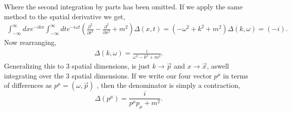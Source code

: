 \documentclass[working, oneside]{../../Preambles/tuftebook}
\begin{document}
Where the second integration by parts has been omitted. If we apply the same method to the spatial derivative we get, 
\begin{align*}
    \int_{-\infty}^{\infty} dx e^{-ikx}\int_{-\infty}^{\infty} dte^{-i\omega t} \left( \frac{\partial ^2}{\partial t^2} - \frac{\partial ^2}{\partial x^2} +m^2 \right) \Delta\left( x,t \right) = \left( -\omega^2 + k^2 + m^2 \right) \Delta\left( k, \omega \right) = \left( -i \right) 
.\end{align*}
Now rearranging,
\begin{align*}
    \Delta\left( k, \omega \right) = \frac{i}{\omega^2 - k^2 + m^2}
.\end{align*}
Generalizing this to 3 spatial dimensions, is just $k \to \vec{p}$ and $x \to \vec{x}$, aswell integrating over the 3 spatial dimensions. If we write our four vector $p^{\mu }$ in terms of differences as $p^{\mu } = \left( \omega, \vec{p} \right) $ , then the denominator is simply a contraction,
\[
\Delta\left( p^{\mu } \right) = \frac{i}{p^{\mu }p_{\mu } + m^2}
.\] 
\end{document}
